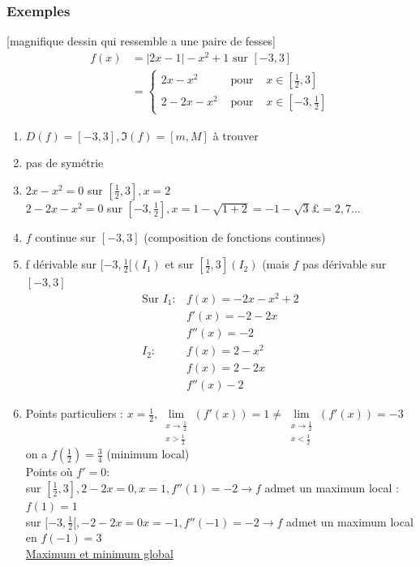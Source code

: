 \documentclass[12pt,a4paper]{article}
\newcommand{\limite}{\lim\limits_}
\newcommand{\llimite}[3]{\limite{\substack{#1 \\ #2}}\left(#3\right)}
\newcommand{\pour}{\mbox{ pour }}
\begin{document}
{\subsubsection{Exemples}
[magnifique dessin qui ressemble a une paire de fesses]
\begin{align*}
f(x) &= |2x-1|-x^2+1\text{ sur }[-3,3]\\
	 &=\left\{
	 		\begin{array}{lll}
				2x-x^2 & \pour & x \in [\frac{1}{2},3]\\
				2-2x -x^2 & \pour & x\in [-3,\frac{1}{2}]
			\end{array}
		\right.	
\end{align*}
\begin{enumerate}
	\item  $D(f) = [-3,3], \Im(f) = [m,M]$ à trouver
	\item pas de symétrie
	\item $2x-x^2 = 0$ sur $[\frac{1}{2}, 3], x = 2$\\
	$2-2x-x^2 = 0$ sur $[-3,\frac{1}{2}], x = 1-\sqrt{1+2} = -1-\sqrt{3} £= 2,7...$
	\item $f$ continue sur $[-3,3]$ (composition de fonctions continues)
	\item f dérivable sur $[-3,\frac{1}{2}[ (I_1)$ et sur $[\frac{1}{2},3](I_2)$ (mais $f$ pas dérivable sur $[-3,3]$\\
	\begin{align*}
		\text{Sur } I_1 : & f(x) = -2x-x^2+2\\
		& f'(x) = -2-2x\\
		&f''(x) = -2\\
		I_2 : & f(x) = 2-x^2\\
		& f(x) = 2-2x\\
		& f''(x) -2
	\end{align*}
	\item Points particuliers : $x = \frac{1}{2}, \llimite{x\to\frac{1}{2}}{x > \frac{1}{2}}{f'(x)} = 1 \neq \llimite{x\to\frac{1}{2}}{x<\frac{1}{2}}{f'(x)} = -3$\\
	on a $f(\frac{1}{2}) = \frac{3}{4}$ (minimum local)\\
	Points où $f' = 0$:\\
	 sur $[\frac{1}{2},3], 2-2x = 0, x = 1, f''(1) = -2 \to f$ admet un maximum local : $f(1) = 1$\\
	 sur $[-3,\frac{1}{2}[, -2-2x = 0 x = -1, f''(-1) = -2 \to f$ admet un maximum local en $f(-1) = 3$\\
	 \underline{Maximum et minimum global}\\

\end{enumerate}}
\end{document}
